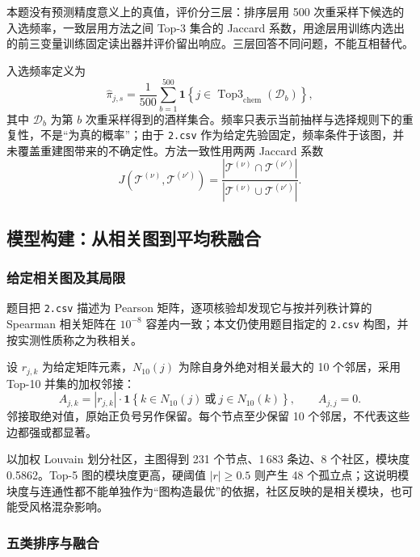 \documentclass[UTF8,a4paper,zihao=-4]{ctexart}
\numberwithin{figure}{section}
\numberwithin{table}{section}
\numberwithin{equation}{section}
\newcommand{\file}[1]{\texttt{#1}}
\begin{document}
本题没有预测精度意义上的真值，评价分三层：排序层用 500 次重采样下候选的入选频率，一致层用方法之间 Top-3 集合的 Jaccard 系数，用途层用训练内选出的前三变量训练固定读出器并评价留出响应。三层回答不同问题，不能互相替代。

入选频率定义为
\begin{equation}
\hat\pi_{j,s}=\frac{1}{500}\sum_{b=1}^{500}\mathbf{1}\left\{j\in\operatorname{Top3}_{\mathrm{chem}}(\mathcal{D}_b)\right\},
\label{eq:freq}
\end{equation}
其中 $\mathcal{D}_b$ 为第 $b$ 次重采样得到的酒样集合。频率只表示当前抽样与选择规则下的重复性，不是“为真的概率”；由于 \file{2.csv} 作为给定先验固定，频率条件于该图，并未覆盖重建图带来的不确定性。方法一致性用两两 Jaccard 系数
\begin{equation}
J\left(\mathcal{T}^{(\nu)},\mathcal{T}^{(\nu')}\right)=\frac{\left|\mathcal{T}^{(\nu)}\cap\mathcal{T}^{(\nu')}\right|}{\left|\mathcal{T}^{(\nu)}\cup\mathcal{T}^{(\nu')}\right|}.
\label{eq:jaccard}
\end{equation}

\subsection{模型构建：从相关图到平均秩融合}

\subsubsection{给定相关图及其局限}

题目把 \file{2.csv} 描述为 Pearson 矩阵，逐项核验却发现它与按并列秩计算的 Spearman 相关矩阵在 $10^{-8}$ 容差内一致；本文仍使用题目指定的 \file{2.csv} 构图，并按实测性质称之为秩相关。

设 $r_{j,k}$ 为给定矩阵元素，$N_{10}(j)$ 为除自身外绝对相关最大的 10 个邻居，采用 Top-10 并集的加权邻接：
\begin{equation}
A_{j,k}=\left|r_{j,k}\right|\cdot\mathbf{1}\left\{k\in N_{10}(j)\ \text{或}\ j\in N_{10}(k)\right\},\qquad A_{j,j}=0.
\label{eq:adj}
\end{equation}
邻接取绝对值，原始正负号另作保留。每个节点至少保留 10 个邻居，不代表这些边都强或都显著。

以加权 Louvain 划分社区\cite{langfelder2008}，主图得到 231 个节点、1\,683 条边、8 个社区，模块度 0.5862。Top-5 图的模块度更高，硬阈值 $|r|\ge0.5$ 则产生 48 个孤立点；这说明模块度与连通性都不能单独作为“图构造最优”的依据，社区反映的是相关模块，也可能受风格混杂影响。

\subsubsection{五类排序与融合}
\end{document}
